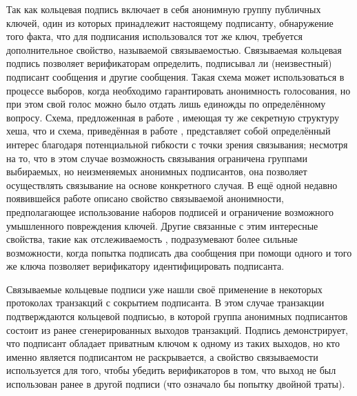 \documentclass{article}
\theoremstyle{definition}
\begin{document}
Так как кольцевая подпись включает в себя анонимную группу публичных ключей, один из которых принадлежит настоящему подписанту, обнаружение того факта, что для подписания использовался тот же ключ, требуется дополнительное свойство, называемой связываемостью. Связываемая кольцевая подпись \cite{lsag} позволяет верификаторам определить, подписывал ли (неизвестный) подписант сообщения и другие сообщения. Такая схема может использоваться в процессе выборов, когда необходимо гарантировать анонимность голосования, но при этом свой голос можно было отдать лишь единожды по определённому вопросу. Схема, предложенная в работе \cite{lsag}, имеющая ту же секретную структуру хеша, что и схема, приведённая в работе \cite{schnorr}, представляет собой определённый интерес благодаря потенциальной гибкости с точки зрения связывания; несмотря на то, что в этом случае возможность связывания ограничена группами выбираемых, но неизменяемых анонимных подписантов, она позволяет осуществлять связывание на основе конкретного случая. В ещё одной недавно появившейся работе \cite{backes} описано свойство связываемой анонимности, предполагающее использование наборов подписей и ограничение возможного умышленного повреждения ключей. Другие связанные с этим интересные свойства, такие как отслеживаемость \cite{fs,f}, подразумевают более сильные возможности, когда попытка подписать два сообщения при помощи одного и того же ключа позволяет верификатору идентифицировать подписанта.

Связываемые кольцевые подписи уже нашли своё применение в некоторых протоколах транзакций с сокрытием подписанта. В этом случае транзакции подтверждаются кольцевой подписью, в которой группа анонимных подписантов состоит из ранее сгенерированных выходов транзакций. Подпись демонстрирует, что подписант обладает приватным ключом к одному из таких выходов, но кто именно является подписантом не раскрывается, а свойство связываемости используется для того, чтобы убедить верификаторов в том, что выход не был использован ранее в другой подписи (что означало бы попытку двойной траты).
\end{document}
